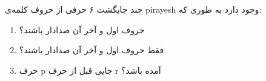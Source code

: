 \p
چند جایگشت ۶ حرفی از حروف کلمه‌ی pirayesh
وجود دارد به طوری که:
\begin{enumerate}
  \item 
    حروف اول و آخر آن صدادار باشند؟

  \item 
    فقط حروف اول و آخر آن صدادار باشند؟

  \item 
    حرف p 
    جایی قبل از حرف r 
    آمده باشد؟
\end{enumerate}